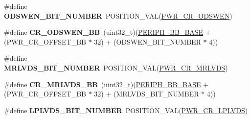 \begin{DoxyCompactItemize}
\item 
\#define {\bfseries O\+D\+S\+W\+E\+N\+\_\+\+B\+I\+T\+\_\+\+N\+U\+M\+B\+ER}~P\+O\+S\+I\+T\+I\+O\+N\+\_\+\+V\+AL(\hyperlink{group___peripheral___registers___bits___definition_gaf1e865d13e084ed53bded37c3cdea173}{P\+W\+R\+\_\+\+C\+R\+\_\+\+O\+D\+S\+W\+EN})\hypertarget{group___p_w_r_ex__register__alias__address_gaedd8b85a6ee45b4816a46e7295525d50}{}\label{group___p_w_r_ex__register__alias__address_gaedd8b85a6ee45b4816a46e7295525d50}

\item 
\#define {\bfseries C\+R\+\_\+\+O\+D\+S\+W\+E\+N\+\_\+\+BB}~(uint32\+\_\+t)(\hyperlink{group___peripheral__memory__map_gaed7efc100877000845c236ccdc9e144a}{P\+E\+R\+I\+P\+H\+\_\+\+B\+B\+\_\+\+B\+A\+SE} + (P\+W\+R\+\_\+\+C\+R\+\_\+\+O\+F\+F\+S\+E\+T\+\_\+\+BB $\ast$ 32) + (O\+D\+S\+W\+E\+N\+\_\+\+B\+I\+T\+\_\+\+N\+U\+M\+B\+ER $\ast$ 4))\hypertarget{group___p_w_r_ex__register__alias__address_ga4915f7ce72ac67213c7a5b50bce70d54}{}\label{group___p_w_r_ex__register__alias__address_ga4915f7ce72ac67213c7a5b50bce70d54}

\item 
\#define {\bfseries M\+R\+L\+V\+D\+S\+\_\+\+B\+I\+T\+\_\+\+N\+U\+M\+B\+ER}~P\+O\+S\+I\+T\+I\+O\+N\+\_\+\+V\+AL(\hyperlink{group___peripheral___registers___bits___definition_ga40e8c390899e9e836f1c52d90b64488d}{P\+W\+R\+\_\+\+C\+R\+\_\+\+M\+R\+L\+V\+DS})\hypertarget{group___p_w_r_ex__register__alias__address_ga28a0fb2b4631ef67fa151764489fbf24}{}\label{group___p_w_r_ex__register__alias__address_ga28a0fb2b4631ef67fa151764489fbf24}

\item 
\#define {\bfseries C\+R\+\_\+\+M\+R\+L\+V\+D\+S\+\_\+\+BB}~(uint32\+\_\+t)(\hyperlink{group___peripheral__memory__map_gaed7efc100877000845c236ccdc9e144a}{P\+E\+R\+I\+P\+H\+\_\+\+B\+B\+\_\+\+B\+A\+SE} + (P\+W\+R\+\_\+\+C\+R\+\_\+\+O\+F\+F\+S\+E\+T\+\_\+\+BB $\ast$ 32) + (M\+R\+L\+V\+D\+S\+\_\+\+B\+I\+T\+\_\+\+N\+U\+M\+B\+ER $\ast$ 4))\hypertarget{group___p_w_r_ex__register__alias__address_ga07027fcac2bdf595eaf9d0933fbdaeec}{}\label{group___p_w_r_ex__register__alias__address_ga07027fcac2bdf595eaf9d0933fbdaeec}

\item 
\#define {\bfseries L\+P\+L\+V\+D\+S\+\_\+\+B\+I\+T\+\_\+\+N\+U\+M\+B\+ER}~P\+O\+S\+I\+T\+I\+O\+N\+\_\+\+V\+AL(\hyperlink{group___peripheral___registers___bits___definition_ga6e37ea5ff0bd06d0d5aa7b2f15d63495}{P\+W\+R\+\_\+\+C\+R\+\_\+\+L\+P\+L\+V\+DS})\hypertarget{group___p_w_r_ex__register__alias__address_ga275a1c9f059c6d03973211a12b88311f}{}\label{group___p_w_r_ex__register__alias__address_ga275a1c9f059c6d03973211a12b88311f}


\end{DoxyCompactItemize}
